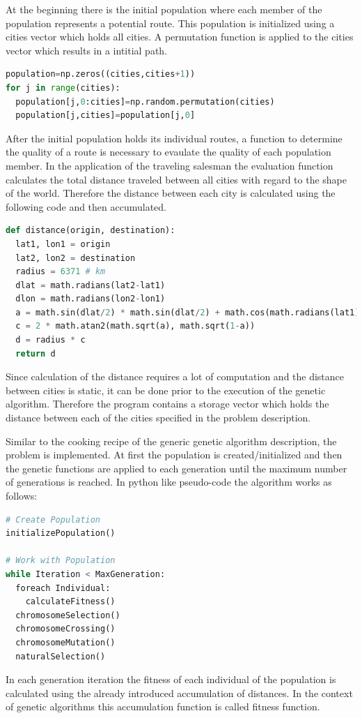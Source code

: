 \documentclass[11pt,a4paper]{article}
\begin{document}
At the beginning there is the initial population where each member of the population represents a potential route. This population is initialized using a cities vector which holds all cities. A permutation function is applied to the cities vector which results in a intitial path.\\
\begin{lstlisting}[language=Python]
population=np.zeros((cities,cities+1))
for j in range(cities):
  population[j,0:cities]=np.random.permutation(cities)
  population[j,cities]=population[j,0]
\end{lstlisting}
After the initial population holds its individual routes, a function to determine the quality of a route is necessary to evaulate the quality of each population member. In the application of the traveling salesman the evaluation function calculates the total distance traveled between all cities with regard to the shape of the world. Therefore the distance between each city is calculated using the following code and then accumulated.\\
\begin{lstlisting}[language=Python]
def distance(origin, destination):
  lat1, lon1 = origin
  lat2, lon2 = destination
  radius = 6371 # km
  dlat = math.radians(lat2-lat1)
  dlon = math.radians(lon2-lon1)
  a = math.sin(dlat/2) * math.sin(dlat/2) + math.cos(math.radians(lat1)) * math.cos(math.radians(lat2)) * math.sin(dlon/2) * math.sin(dlon/2)
  c = 2 * math.atan2(math.sqrt(a), math.sqrt(1-a))
  d = radius * c
  return d
\end{lstlisting}                        
Since calculation of the distance requires a lot of computation and the distance between cities is static, it can be done prior to the execution of the genetic algorithm. Therefore the program contains a storage vector which holds the distance between each of the cities specified in the problem description. 

Similar to the cooking recipe of the generic genetic algorithm description, the problem is implemented. At first the population is created/initialized and then the genetic functions are applied to each generation until the maximum number of generations is reached.
In python like pseudo-code the algorithm works as follows:\newpage
\begin{lstlisting}[language=Python]
# Create Population
initializePopulation()

# Work with Population
while Iteration < MaxGeneration:
  foreach Individual:
    calculateFitness()
  chromosomeSelection()
  chromosomeCrossing()
  chromosomeMutation()
  naturalSelection()
\end{lstlisting}
In each generation iteration the fitness of each individual of the population is calculated using the already introduced accumulation of distances. In the context of genetic algorithms this accumulation function is called fitness function.
\end{document}
